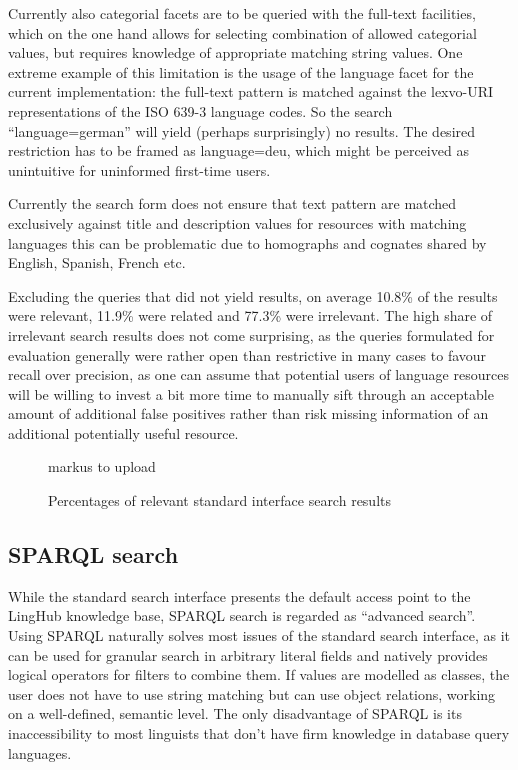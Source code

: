 \documentclass[smallextended]{svjour3}       %
\begin{document}
Currently also categorial facets are to be queried with the full-text
facilities, which on the one hand allows for selecting combination of allowed
categorial values, but requires knowledge of appropriate matching string values.
One extreme example of this limitation is the usage of the language facet for
the current implementation: the full-text pattern is matched against the
lexvo-URI representations of the ISO 639-3 language codes. So the search
``language=german'' will yield (perhaps surprisingly) no results. The desired
restriction has to be framed as language=deu, which might be perceived as
unintuitive for uninformed first-time users. 

Currently the search form does not ensure that text pattern are matched
exclusively against title and description values for resources with matching
languages this can be problematic due to homographs and cognates shared by
English, Spanish, French etc.  

Excluding the queries that did not yield results, on average 10.8\% of the
results were relevant, 11.9\% were related and 77.3\% were irrelevant. The high
share of irrelevant search results does not come surprising, as the queries
formulated for evaluation generally were rather open than restrictive in many
cases to favour recall over precision, as one can assume that potential users of
language resources will be willing to invest a bit more time to manually sift
through an acceptable amount of additional false positives rather than risk
missing information of an additional potentially useful resource. 

\begin{figure}
    markus to upload
    \caption{\label{fig:freetext}Percentages of relevant standard interface
    search results}
\end{figure}

\subsection{SPARQL search}

While the standard search interface presents the default access point to the
LingHub knowledge base, SPARQL search is regarded as ``advanced search''. Using
SPARQL naturally solves most issues of the standard search interface, as it can
be used for granular search in arbitrary literal fields and natively provides
logical operators for filters to combine them. If values are modelled as
classes, the user does not have to use string matching but can use object
relations, working on a well-defined, semantic level. The only disadvantage of
SPARQL is its inaccessibility to most linguists that don’t have firm knowledge
in database query languages.  
\end{document}
